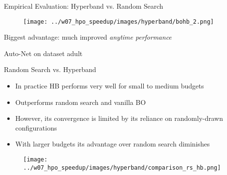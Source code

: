     


    


\begin{frame}{Empirical Evaluation: Hyperband vs. Random Search}

\vskip -10pt
\hskip 270pt

\begin{figure}
    \centering
    \texttt{[image: ../w07\_hpo\_speedup/images/hyperband/bohb\_2.png]}
\end{figure}

\begin{center}
    Biggest advantage: much improved \emph{anytime performance}
    
    \tiny{Auto-Net on dataset adult}
\end{center}

\end{frame}

\begin{frame}{Random Search vs. Hyperband}

\begin{itemize}
    \item In practice HB performs very well for small to medium budgets
    \item Outperforms random search and vanilla BO
    \item However, its convergence is limited by its reliance on randomly-drawn configurations
    \item With larger budgets its advantage over random search diminishes
\end{itemize}
\begin{figure}
    \centering
    \texttt{[image: ../w07\_hpo\_speedup/images/hyperband/comparison\_rs\_hb.png]}
\end{figure}


\end{frame}

